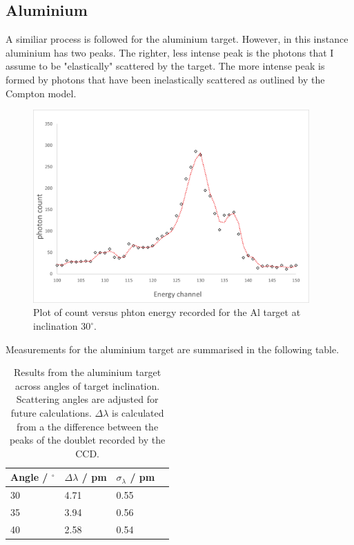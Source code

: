 \documentclass{article}%
\begin{document}
\subsection{Aluminium}
A similiar process is followed for the aluminium target. However, in this instance aluminium has two peaks. The righter, less intense peak is the photons that I assume to be "elastically" scattered by the target. The more intense peak is formed by photons that have been inelastically scattered as outlined by the Compton model.
\begin{figure}[H]
    \centering%
    \includegraphics[width=400px]{al_plot.png}
    \caption{Plot of count versus phton energy recorded for the Al target at inclination $30^\circ$.}%
\end{figure}
Measurements for the aluminium target are summarised in the following table.
\begin{table}[H]
    \begin{centering}
    \begin{tabular}{|p{3cm}|p{3cm}|p{3cm}|p{3cm}|} 
        \hline
        Angle / $^\circ$ & $\Delta \lambda$ / pm & $\sigma_{\lambda}$ / pm  \\ [0.75ex] 
        \hline\hline
        30 & 4.71 & 0.55 \\ 
        \hline
        35 & 3.94 & 0.56 \\
        \hline
        40 & 2.58 & 0.54 \\
        \hline

    \end{tabular}
    \caption{Results from the aluminium target across angles of target inclination. Scattering angles are adjusted for future calculations. $\Delta \lambda$ is calculated from a the difference between the peaks of the doublet recorded by the CCD. }
    \end{centering} 
\end{table}
\end{document}
